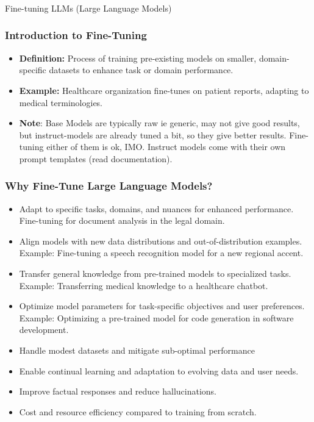 \begin{frame}[fragile]\frametitle{}
\begin{center}
{\Large Fine-tuning LLMs (Large Language Models)}
\end{center}
\end{frame}

\begin{frame}[fragile]\frametitle{Introduction to Fine-Tuning}
  \begin{itemize}
    \item \textbf{Definition:} Process of training pre-existing models on smaller, domain-specific datasets to enhance task or domain performance.

    \item \textbf{Example:} Healthcare organization fine-tunes on patient reports, adapting to medical terminologies.
	
	\item \textbf{Note}: Base Models are typically raw ie generic, may not give good results, but instruct-models are already tuned a bit, so they give better results. Fine-tuning either of them is ok, IMO. Instruct models come with their own prompt templates (read documentation).

  \end{itemize}
\end{frame}

\begin{frame}[fragile]\frametitle{Why Fine-Tune Large Language Models?}
  \begin{itemize}
    \item Adapt to specific tasks, domains, and nuances for enhanced performance. Fine-tuning for document analysis in the legal domain.
    \item Align models with new data distributions and out-of-distribution examples. Example: Fine-tuning a speech recognition model for a new regional accent.
    \item Transfer general knowledge from pre-trained models to specialized tasks. Example: Transferring medical knowledge to a healthcare chatbot.
    \item Optimize model parameters for task-specific objectives and user preferences. Example: Optimizing a pre-trained model for code generation in software development.
    \item Handle modest datasets and mitigate sub-optimal performance
    \item Enable continual learning and adaptation to evolving data and user needs.
    \item Improve factual responses and reduce hallucinations.
    \item Cost and resource efficiency compared to training from scratch.
  \end{itemize}
\end{frame}


